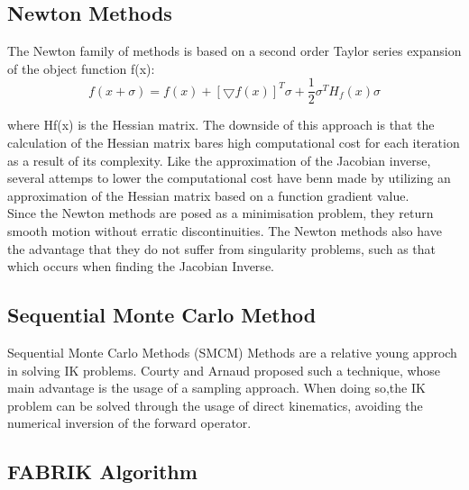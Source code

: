 \subsection{Newton Methods}
The Newton family of methods is based on a second order Taylor series expansion of the object function f(x):
\begin{equation}
f(x+\sigma)= f(x)+ [\bigtriangledown f(x)]^{T}\sigma + \frac{1}{2}\sigma^{T}H_{f}(x)\sigma
\end{equation}

where Hf(x) is the Hessian matrix. The downside of this approach is that the calculation of the Hessian matrix bares high computational cost for each iteration as a result of its complexity. Like the approximation of the Jacobian inverse, several attemps to lower the computational cost have benn made by utilizing an approximation of the Hessian matrix based on a function gradient value.\\
Since the Newton methods are posed as a minimisation problem, they return smooth motion without erratic discontinuities.
The Newton methods also have the advantage that they do not suffer from singularity problems, such as that which occurs when finding the Jacobian Inverse.
\subsection{Sequential Monte Carlo Method}
Sequential Monte Carlo Methods (SMCM) Methods are a relative young approch in solving IK problems. Courty and Arnaud \cite{Courty.2008} proposed such a technique, whose main advantage is the usage of a sampling approach. When doing so,the IK problem can be solved  through the usage of direct kinematics, avoiding the numerical inversion of the forward operator.


\newpage
\subsection{FABRIK Algorithm}

